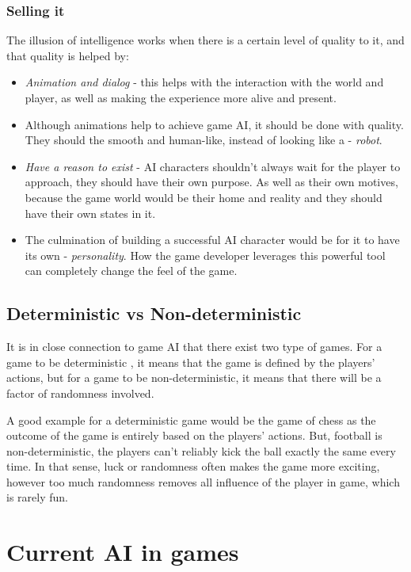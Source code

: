 \documentclass[a4paper, 12pt]{book}
\begin{document}
\subsection{Selling it}
The illusion of intelligence \cite{IllusionOfIntelligece} works when there is a certain level of quality to it, and that quality is helped by:
\begin{itemize}
    \item \emph{Animation and dialog} - this helps with the interaction with the world and player, as well as making the experience more alive and present.
    \item Although animations help to achieve game AI, it should be done with quality. They should the smooth and human-like, instead of looking like a - \emph{robot}.
    \item \emph{Have a reason to exist} - AI characters shouldn't always wait for the player to approach, they should have their own purpose. As well as their own motives, because the game world would be their home and reality and they should have their own states in it.
    \item The culmination of building a successful AI character would be for it to have its own - \emph{personality}. How the game developer leverages this powerful tool can completely change the feel of the game.
\end{itemize}


\section{Deterministic vs Non-deterministic}
It is in close connection to game AI that there exist two type of games. 
For a game to be deterministic \cite{DeepLearningGO}, it means that the game is defined by the players' actions, but for a game to be non-deterministic, it means that there will be a factor of randomness involved.

A good example for a deterministic game would be the game of chess as the outcome of the game is entirely based on the players' actions. But, football is non-deterministic, the players can't reliably kick the ball exactly the same every time. In that sense, luck or randomness often makes the game more exciting, however too much randomness removes all influence of the player in game, which is rarely fun.


\chapter{Current AI in games}
\label{ch2}
\end{document}
